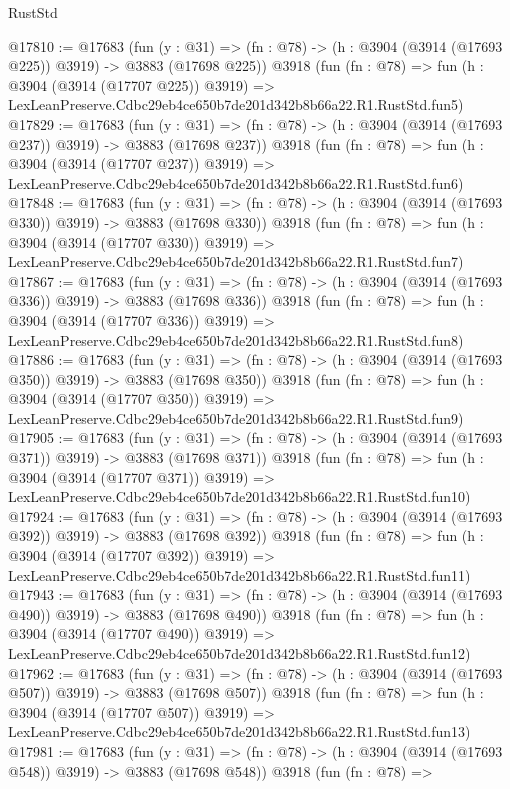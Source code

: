 \begin{lexlean}{RustStd}
\begin{coremodule}
@17810 := @17683
    (fun (y : @31) => (fn : @78) -> (h : @3904 (@3914 (@17693 @225)) @3919) -> @3883 (@17698 @225))
    @3918
    (fun (fn : @78) =>
    fun (h : @3904 (@3914 (@17707 @225)) @3919) =>
    LexLeanPreserve.Cdbc29eb4ce650b7de201d342b8b66a22.R1.RustStd.fun5)
@17829 := @17683
    (fun (y : @31) => (fn : @78) -> (h : @3904 (@3914 (@17693 @237)) @3919) -> @3883 (@17698 @237))
    @3918
    (fun (fn : @78) =>
    fun (h : @3904 (@3914 (@17707 @237)) @3919) =>
    LexLeanPreserve.Cdbc29eb4ce650b7de201d342b8b66a22.R1.RustStd.fun6)
@17848 := @17683
    (fun (y : @31) => (fn : @78) -> (h : @3904 (@3914 (@17693 @330)) @3919) -> @3883 (@17698 @330))
    @3918
    (fun (fn : @78) =>
    fun (h : @3904 (@3914 (@17707 @330)) @3919) =>
    LexLeanPreserve.Cdbc29eb4ce650b7de201d342b8b66a22.R1.RustStd.fun7)
@17867 := @17683
    (fun (y : @31) => (fn : @78) -> (h : @3904 (@3914 (@17693 @336)) @3919) -> @3883 (@17698 @336))
    @3918
    (fun (fn : @78) =>
    fun (h : @3904 (@3914 (@17707 @336)) @3919) =>
    LexLeanPreserve.Cdbc29eb4ce650b7de201d342b8b66a22.R1.RustStd.fun8)
@17886 := @17683
    (fun (y : @31) => (fn : @78) -> (h : @3904 (@3914 (@17693 @350)) @3919) -> @3883 (@17698 @350))
    @3918
    (fun (fn : @78) =>
    fun (h : @3904 (@3914 (@17707 @350)) @3919) =>
    LexLeanPreserve.Cdbc29eb4ce650b7de201d342b8b66a22.R1.RustStd.fun9)
@17905 := @17683
    (fun (y : @31) => (fn : @78) -> (h : @3904 (@3914 (@17693 @371)) @3919) -> @3883 (@17698 @371))
    @3918
    (fun (fn : @78) =>
    fun (h : @3904 (@3914 (@17707 @371)) @3919) =>
    LexLeanPreserve.Cdbc29eb4ce650b7de201d342b8b66a22.R1.RustStd.fun10)
@17924 := @17683
    (fun (y : @31) => (fn : @78) -> (h : @3904 (@3914 (@17693 @392)) @3919) -> @3883 (@17698 @392))
    @3918
    (fun (fn : @78) =>
    fun (h : @3904 (@3914 (@17707 @392)) @3919) =>
    LexLeanPreserve.Cdbc29eb4ce650b7de201d342b8b66a22.R1.RustStd.fun11)
@17943 := @17683
    (fun (y : @31) => (fn : @78) -> (h : @3904 (@3914 (@17693 @490)) @3919) -> @3883 (@17698 @490))
    @3918
    (fun (fn : @78) =>
    fun (h : @3904 (@3914 (@17707 @490)) @3919) =>
    LexLeanPreserve.Cdbc29eb4ce650b7de201d342b8b66a22.R1.RustStd.fun12)
@17962 := @17683
    (fun (y : @31) => (fn : @78) -> (h : @3904 (@3914 (@17693 @507)) @3919) -> @3883 (@17698 @507))
    @3918
    (fun (fn : @78) =>
    fun (h : @3904 (@3914 (@17707 @507)) @3919) =>
    LexLeanPreserve.Cdbc29eb4ce650b7de201d342b8b66a22.R1.RustStd.fun13)
@17981 := @17683
    (fun (y : @31) => (fn : @78) -> (h : @3904 (@3914 (@17693 @548)) @3919) -> @3883 (@17698 @548))
    @3918
    (fun (fn : @78) =>

\end{coremodule}
\end{lexlean}
